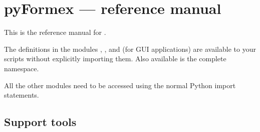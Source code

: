 
\chapter{pyFormex --- reference manual}
\label{cha:reference}

This is the reference manual for \pyformex.


The definitions in the modules , ,  and (for GUI applications)  are available to your \pyformex scripts without explicitly importing them. Also available is the complete  namespace.

All the other modules need to be accessed using the normal Python import statements.















\section{Support tools}




